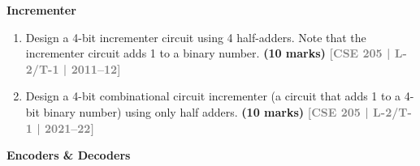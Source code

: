 \documentclass[12pt,a4paper]{article}
\newcommand{\yr}[1]{\hfill\textcolor{gray}{\small\textbf{[#1]}}}
\newcommand{\mk}[1]{\textcolor{orange!70!black}{\small\textbf{(#1 marks)}}}
\newcommand{\subtopic}[2]{%
  \vspace{10pt}
  \noindent\begin{tcolorbox}[colback=#1!8,colframe=#1,boxrule=0.6pt,arc=4pt,
    left=6pt,right=6pt,top=4pt,bottom=4pt]
    \small\bfseries\textcolor{#1}{#2}
  \end{tcolorbox}
  \vspace{2pt}
}
\begin{document}
\subtopic{cD}{Incrementer}
\label{sub:s4-incrementer}

\begin{enumerate}

\item Design a 4-bit incrementer circuit using 4 half-adders. Note that the incrementer circuit adds 1 to a binary number.
\mk{10} \yr{CSE 205 | L-2/T-1 | 2011--12}

\item Design a 4-bit combinational circuit incrementer (a circuit that adds 1 to a 4-bit binary number) using only half adders.
\mk{10} \yr{CSE 205 | L-2/T-1 | 2021--22}

\end{enumerate}

\subtopic{cD}{Encoders \& Decoders}
\label{sub:s4-encoders}
\end{document}
